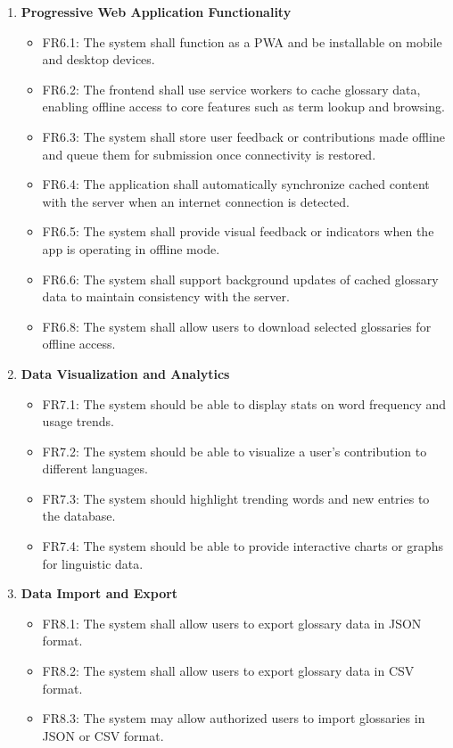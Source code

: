 \documentclass[12pt]{article}
\begin{document}
\begin{enumerate}[label=FR\arabic*:, leftmargin=2.5em]
    \item \textbf{Progressive Web Application Functionality}
    \begin{itemize}
        \item FR6.1: The system shall function as a PWA and be installable on mobile and desktop devices.
        \item FR6.2: The frontend shall use service workers to cache glossary data, enabling offline access to core features such as term lookup and browsing.
        \item FR6.3: The system shall store user feedback or contributions made offline and queue them for submission once connectivity is restored.
        \item FR6.4: The application shall automatically synchronize cached content with the server when an internet connection is detected.
        \item FR6.5: The system shall provide visual feedback or indicators when the app is operating in offline mode.
        \item FR6.6: The system shall support background updates of cached glossary data to maintain consistency with the server.
        \item FR6.8: The system shall allow users to download selected glossaries for offline access.
    \end{itemize}

    \item \textbf{Data Visualization and Analytics}
    \begin{itemize}
        \item FR7.1: The system should be able to display stats on word frequency and usage trends.
        \item FR7.2: The system should be able to visualize a user's contribution to different languages.
        \item FR7.3: The system should highlight trending words and new entries to the database.
        \item FR7.4: The system should be able to provide interactive charts or graphs for linguistic data.
    \end{itemize}

    \item \textbf{Data Import and Export}
    \begin{itemize}
        \item FR8.1: The system shall allow users to export glossary data in JSON format.
        \item FR8.2: The system shall allow users to export glossary data in CSV format.
        \item FR8.3: The system may allow authorized users to import glossaries in JSON or CSV format.
    \end{itemize}

\end{enumerate}
\end{document}
